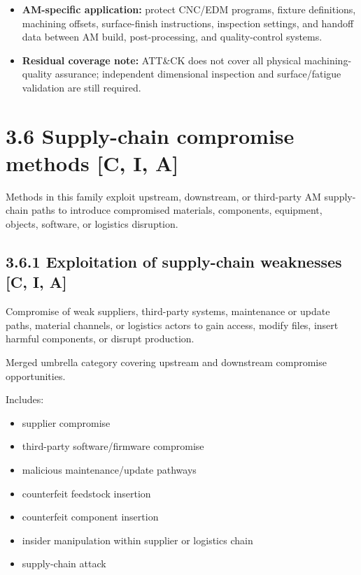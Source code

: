 \documentclass[10pt,a4paper,oneside]{report}
\begin{document}
\begin{itemize}
\item \textbf{AM-specific application:} protect CNC/EDM programs, fixture definitions, machining offsets, surface-finish instructions, inspection settings, and handoff data between AM build, post-processing, and quality-control systems.
\end{itemize}

\begin{itemize}
\item \textbf{Residual coverage note:} ATT\&CK does not cover all physical machining-quality assurance; independent dimensional inspection and surface/fatigue validation are still required.
\end{itemize}


\section{3.6 Supply-chain compromise methods [C, I, A]}


Methods in this family exploit upstream, downstream, or third-party AM supply-chain paths to introduce compromised materials, components, equipment, objects, software, or logistics disruption.


\subsection{3.6.1 Exploitation of supply-chain weaknesses [C, I, A]}


Compromise of weak suppliers, third-party systems, maintenance or update paths, material channels, or logistics actors to gain access, modify files, insert harmful components, or disrupt production.

Merged umbrella category covering upstream and downstream compromise opportunities.

Includes:

\begin{itemize}
\item supplier compromise
\item third-party software/firmware compromise
\item malicious maintenance/update pathways
\item counterfeit feedstock insertion
\item counterfeit component insertion
\item insider manipulation within supplier or logistics chain
\item supply-chain attack
\end{itemize}
\end{document}
